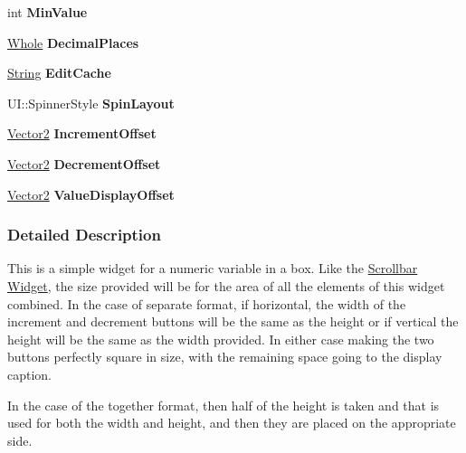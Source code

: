 \begin{DoxyCompactItemize}
\item 
\hypertarget{classphys_1_1UI_1_1Spinner_a615c7f96fd2267247a7537043d521a08}{
int {\bfseries MinValue}}
\label{d7/d81/classphys_1_1UI_1_1Spinner_a615c7f96fd2267247a7537043d521a08}

\item 
\hypertarget{classphys_1_1UI_1_1Spinner_a52fded30d32953017aebee4eaf11477a}{
\hyperlink{namespacephys_a460f6bc24c8dd347b05e0366ae34f34a}{Whole} {\bfseries DecimalPlaces}}
\label{d7/d81/classphys_1_1UI_1_1Spinner_a52fded30d32953017aebee4eaf11477a}

\item 
\hypertarget{classphys_1_1UI_1_1Spinner_a9d9d8a835f927a1ad747331f034cbcba}{
\hyperlink{namespacephys_aa03900411993de7fbfec4789bc1d392e}{String} {\bfseries EditCache}}
\label{d7/d81/classphys_1_1UI_1_1Spinner_a9d9d8a835f927a1ad747331f034cbcba}

\item 
\hypertarget{classphys_1_1UI_1_1Spinner_a9e46f97ce5d56a7595ee49071dcf29bc}{
UI::SpinnerStyle {\bfseries SpinLayout}}
\label{d7/d81/classphys_1_1UI_1_1Spinner_a9e46f97ce5d56a7595ee49071dcf29bc}

\item 
\hypertarget{classphys_1_1UI_1_1Spinner_ad023b770c4ef4fff72ebae0e5d29836a}{
\hyperlink{classphys_1_1Vector2}{Vector2} {\bfseries IncrementOffset}}
\label{d7/d81/classphys_1_1UI_1_1Spinner_ad023b770c4ef4fff72ebae0e5d29836a}

\item 
\hypertarget{classphys_1_1UI_1_1Spinner_aa8daf18f7da42d29bc12bd449a285a10}{
\hyperlink{classphys_1_1Vector2}{Vector2} {\bfseries DecrementOffset}}
\label{d7/d81/classphys_1_1UI_1_1Spinner_aa8daf18f7da42d29bc12bd449a285a10}

\item 
\hypertarget{classphys_1_1UI_1_1Spinner_a528269192dd2e2b85b31c8aa8b0552c8}{
\hyperlink{classphys_1_1Vector2}{Vector2} {\bfseries ValueDisplayOffset}}
\label{d7/d81/classphys_1_1UI_1_1Spinner_a528269192dd2e2b85b31c8aa8b0552c8}

\end{DoxyCompactItemize}


\subsubsection{Detailed Description}
This is a simple widget for a numeric variable in a box. Like the \hyperlink{classphys_1_1UI_1_1Scrollbar}{Scrollbar} \hyperlink{classphys_1_1UI_1_1Widget}{Widget}, the size provided will be for the area of all the elements of this widget combined. In the case of separate format, if horizontal, the width of the increment and decrement buttons will be the same as the height or if vertical the height will be the same as the width provided. In either case making the two buttons perfectly square in size, with the remaining space going to the display caption. \par
 In the case of the together format, then half of the height is taken and that is used for both the width and height, and then they are placed on the appropriate side. 

